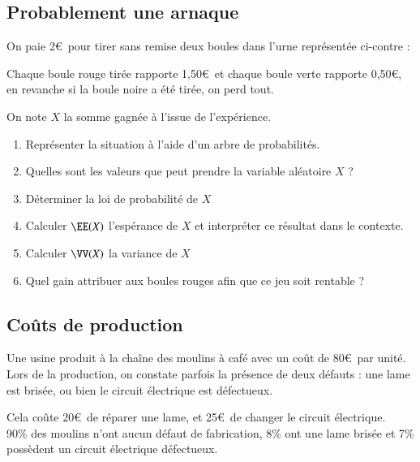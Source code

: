\documentclass[oneside,12pt]{article}          %
\begin{document}
\subsection{Probablement une arnaque}
On paie 2\euro\, pour tirer sans remise deux boules dans l'urne représentée ci-contre :

Chaque boule rouge tirée rapporte 1,50\euro\, et chaque boule verte rapporte 0,50\euro, en revanche si la boule noire a été tirée, on perd tout.

On note $X$ la somme gagnée à l'issue de l'expérience.
\begin{enumerate}
    \item Représenter la situation à l'aide d'un arbre de probabilités.
    \item Quelles sont les valeurs que peut prendre la variable aléatoire $X$ ?
    \item Déterminer la loi de probabilité de $X$
    \item Calculer $\EE(X)$ l'espérance de $X$ et interpréter ce résultat dans le contexte.
    \item Calculer $\VV(X)$ la variance de $X$
    \item Quel gain attribuer aux boules rouges afin que ce jeu soit rentable ?
\end{enumerate}



\subsection{Coûts de production}
Une usine produit à la chaîne des moulins à café avec un coût de 80\euro\, par unité. \\
Lors de la production, on constate parfois la présence de deux défauts : une lame est brisée, ou bien le circuit électrique est défectueux.

Cela coûte 20\euro\, de réparer une lame, et 25\euro\, de changer le circuit électrique. \\
90\% des moulins n'ont aucun défaut de fabrication, 8\% ont une lame brisée et 7\% possèdent un circuit électrique défectueux.
\end{document}
